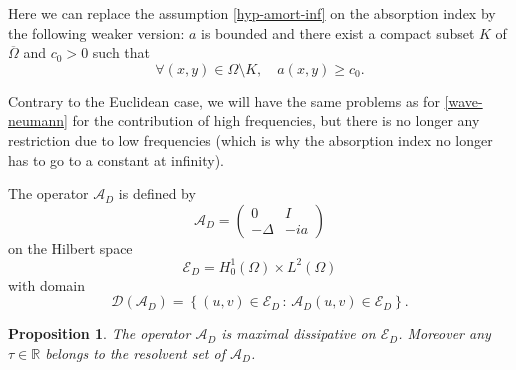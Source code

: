 \documentclass[10pt, a4paper,reqno]{amsart}
\theoremstyle{plain}
\newtheorem{proposition}[theorem]{Proposition}
\theoremstyle{definition}
\theoremstyle{remark}
\begin{document}
Here we can replace the assumption \eqref{hyp-amort-inf} on the absorption index by the following weaker version: $a$ is bounded and there exist a compact subset $K$ of ${\overline{\Omega}}$ and $c_0 > 0$ such that 
\begin{equation} \label{hyp-amort-Dir}
\forall (x,y) \in {\Omega} \setminus K, \quad a(x,y) {\geqslant} c_0.
\end{equation}

Contrary to the Euclidean case, we will have the same problems as for \eqref{wave-neumann} for the contribution of high frequencies, but there is no longer any restriction due to low frequencies (which is why the absorption index no longer has to go to a constant at infinity). 

The operator ${{{\mathcal A}}_D}$ is defined by 
\[
{{{\mathcal A}}_D} = \begin{pmatrix} 0 & I \\ -{\Delta} & -i a \end{pmatrix}
\]
on the Hilbert space 
\[
{\mathscr E_D} = H^1_0({\Omega}) \times L^2({\Omega})
\]
with domain
\begin{equation} \label{dom-Ac-D}
{{\mathcal D}}({{{\mathcal A}}_D}) = {\left\{ {(u,v) \in {\mathscr E_D} {\,:\,} {{{\mathcal A}}_D} (u,v) \in {\mathscr E_D}} \right\}}.
\end{equation}

\begin{proposition} \label{prop-res-reelle-Dir}
The operator ${{{\mathcal A}}_D}$ is maximal dissipative on ${\mathscr E_D}$. Moreover any ${\tau} \in {\mathbb{R}}$ belongs to the resolvent set of ${{{\mathcal A}}_D}$.
\end{proposition}
\end{document}
